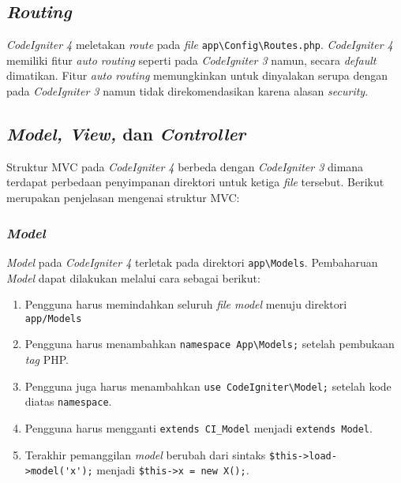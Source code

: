 \subsection{\textit{Routing}}

\textit{CodeIgniter 4} meletakan \textit{route} pada \textit{file} \verb|app\Config\Routes.php|. \textit{CodeIgniter 4} memiliki fitur \textit{auto routing} seperti pada \textit{CodeIgniter 3} namun, secara \textit{default} dimatikan. Fitur \textit{auto routing} memungkinkan untuk dinyalakan serupa dengan pada \textit{CodeIgniter 3} namun tidak direkomendasikan karena alasan \textit{security}.
 
\subsection{\textit{Model, View,} dan \textit{Controller}}
 
Struktur MVC pada \textit{CodeIgniter 4} berbeda dengan \textit{CodeIgniter 3} dimana terdapat perbedaan penyimpanan direktori untuk ketiga \textit{file} tersebut. Berikut merupakan penjelasan mengenai struktur MVC:

\subsubsection{\textit{Model}}
\textit{Model} pada \textit{CodeIgniter 4} terletak pada direktori \verb|app\Models|. Pembaharuan \textit{Model} dapat dilakukan melalui cara sebagai berikut:
\begin{enumerate}
\item Pengguna harus memindahkan seluruh \textit{file model} menuju direktori \verb|app/Models|
\item Pengguna harus menambahkan \verb|namespace App\Models;| setelah pembukaan \textit{tag} PHP.
\item Pengguna juga harus menambahkan \verb|use CodeIgniter\Model;| setelah kode diatas \texttt{namespace}.
\item Pengguna harus mengganti \verb|extends CI_Model| menjadi \verb|extends Model|.
\item Terakhir pemanggilan \textit{model} berubah dari sintaks \verb|$this->load->model('x');| menjadi \verb|$this->x = new X();|.
\end{enumerate}
 
